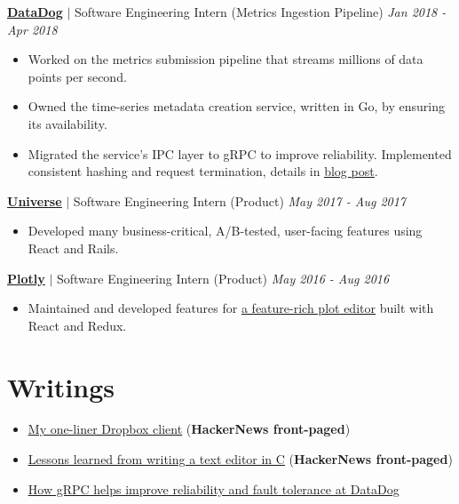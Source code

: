 \documentclass[paper=a4,fontsize=15pt]{scrartcl}
\newcommand{\smolboispace}{\vspace*{0.1em}}
\newcommand{\bighalfspace}{\vspace*{0.75em}}
\begin{document}
\smolboispace
\smolboispace
\bighalfspace
\normalsize
\noindent \href{https://datadoghq.com}{\textbf{\ul{DataDog}}}
$\vert$ \small Software Engineering Intern (Metrics Ingestion Pipeline)
{\hfill \footnotesize \textit{Jan 2018 - Apr 2018}}
\begin{itemize}[noitemsep,leftmargin=20pt,label=\raisebox{0.25ex}{\tiny$\bullet$},topsep=5pt]
  \small
  \item Worked on the metrics submission pipeline that streams millions of data
    points per second.
  \item Owned the time-series metadata creation service, written in Go, by
    ensuring its availability.
  \item Migrated the service's IPC layer to gRPC to improve reliability.
    Implemented consistent hashing and request termination, details in
    \href{http://lpan.io/migrating-to-grpc}{\ul{blog post}}.
\end{itemize}

\smolboispace
\smolboispace
\bighalfspace
\normalsize
\noindent \href{https://universe.com}{\ul{\textbf{Universe}}}
$\vert$ \small Software Engineering Intern (Product)
{\hfill \footnotesize \textit{May 2017 - Aug 2017}}
\begin{itemize}[noitemsep,leftmargin=20pt,label=\raisebox{0.25ex}{\tiny$\bullet$},topsep=5pt]
  \small
  \item Developed many business-critical, A/B-tested, user-facing features
    using React and Rails.
\end{itemize}

\smolboispace
\smolboispace
\bighalfspace
\normalsize
\noindent \href{https://plot.ly}{\textbf{\ul{Plotly}}}
$\vert$ \small Software Engineering Intern (Product)
{\hfill \footnotesize \textit{May 2016 - Aug 2016}}
\begin{itemize}[noitemsep,leftmargin=20pt,label=\raisebox{0.25ex}{\tiny$\bullet$},topsep=5pt]
  \small
  \item Maintained and developed features for
    \href{https://plot.ly/online-chart-maker/}{\ul{a feature-rich plot
        editor}} built with React and Redux.
\end{itemize}

\section*{Writings}{}
\begin{itemize}[noitemsep,leftmargin=20pt,label=\raisebox{0.25ex}{\tiny$\bullet$},topsep=5pt]
  \small
  \item \href{http://lpan.io/one-liner-dropbox-client}{\ul{My one-liner Dropbox
        client}} (\textbf{HackerNews front-paged})
  \item \href{http://lpan.io/what-i-learnt-from-viw}{\ul{Lessons learned from
        writing a text editor in C}} (\textbf{HackerNews front-paged})
  \item \href{http://lpan.io/migrating-to-grpc}{\ul{How gRPC helps improve
        reliability and fault tolerance at DataDog}}
\end{itemize}
\end{document}
